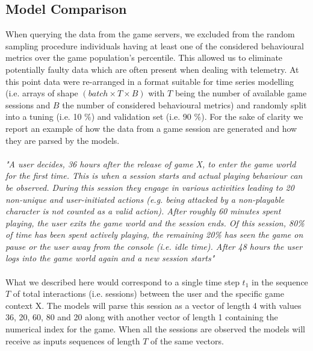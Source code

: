 

\subsection{Model Comparison}
When querying the data from the game servers, we excluded from the random sampling procedure individuals having at least one of the considered behavioural metrics over the game population's  percentile. This allowed us to eliminate potentially faulty data which are often present when dealing with telemetry. At this point data were re-arranged in a format suitable for time series modelling (i.e. arrays of shape $(batch\times T \times B)$ with $T$ being the number of available game sessions and $B$ the number of considered behavioural metrics) and randomly split into a tuning (i.e. 10 \%) and validation set (i.e. 90 \%). For the sake of clarity we report an example of how the data from a game session are generated and how they are parsed by the models.\\
\\
\textit{
"A user decides, 36 hours after the release of game X, to enter the game world for the first time. This is when a session starts and actual playing behaviour can be observed. During this session they engage in various activities leading to 20 non-unique and user-initiated actions (e.g. being attacked by a non-playable character is not counted as a valid action). After roughly 60 minutes spent playing, the user exits the game world and the session ends. Of this session, 80\% of time has been spent actively playing, the remaining 20\% has seen the game on pause or the user away from the console (i.e. idle time). After 48 hours the user logs into the game world again and a new session starts"}\\
\\
What we described here would correspond to a single time step $t_{1}$ in the sequence $T$ of total interactions (i.e. sessions) between the user and the specific game context X. The models will parse this session as a vector of length 4 with values 36, 20, 60, 80 and 20 along with another vector of length 1 containing the numerical index for the game. When all the sessions are observed the models will receive as inputs sequences of length $T$ of the same vectors. 

